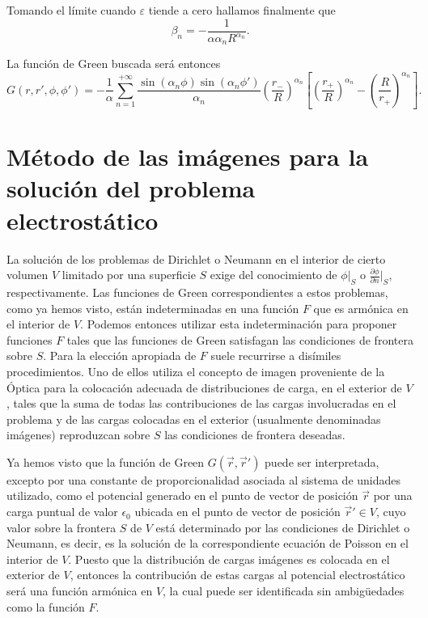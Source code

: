 \documentclass[12pt,a4paper]{book}
\begin{document}
Tomando el límite cuando $\varepsilon$ tiende a cero hallamos finalmente que
\begin{equation}
\beta_n = -\frac{1}{\alpha\alpha_n R^{\alpha_n}}.
\end{equation}

La función de Green buscada será entonces
\begin{equation}
G(r, r', \phi, \phi') = -\frac{1}{\alpha}\sum_{n=1}^{+\infty} \frac{\sin(\alpha_n \phi) \sin(\alpha_n \phi')}{\alpha_n} \left(\frac{r_-}{R}\right)^{\alpha_n} \left[\left(\frac{r_+}{R}\right)^{\alpha_n} - \left(\frac{R}{r_+}\right)^{\alpha_n}\right].
\end{equation}

\section{Método de las imágenes para la solución del problema electrostático}

La solución de los problemas de Dirichlet o Neumann en el interior de cierto volumen $V$ limitado por una superficie $S$ exige del conocimiento de $\phi|_S$ o $\frac{\partial\phi}{\partial n}\big|_S$, respectivamente. Las funciones de Green correspondientes a estos problemas, como ya hemos visto, están indeterminadas en una función $F$ que es armónica en el interior de $V$. Podemos entonces utilizar esta indeterminación para proponer funciones $F$ tales que las funciones de Green satisfagan las condiciones de frontera sobre $S$. Para la elección apropiada de $F$ suele recurrirse a disímiles procedimientos. Uno de ellos utiliza el concepto de imagen proveniente de la Óptica para la colocación adecuada de distribuciones de carga, en el exterior de $V$, tales que la suma de todas las contribuciones de las cargas involucradas en el problema y de las cargas colocadas en el exterior (usualmente denominadas imágenes) reproduzcan sobre $S$ las condiciones de frontera deseadas.

Ya hemos visto que la función de Green $G(\vec{r},\vec{r}')$ puede ser interpretada, excepto por una constante de proporcionalidad asociada al sistema de unidades utilizado, como el potencial generado en el punto de vector de posición $\vec{r}$ por una carga puntual de valor $\epsilon_0$ ubicada en el punto de vector de posición $\vec{r}' \in V$, cuyo valor sobre la frontera $S$ de $V$ está determinado por las condiciones de Dirichlet o Neumann, es decir, es la solución de la correspondiente ecuación de Poisson en el interior de $V$. Puesto que la distribución de cargas imágenes es colocada en el exterior de $V$, entonces la contribución de estas cargas al potencial electrostático será una función armónica en $V$, la cual puede ser identificada sin ambigüedades como la función $F$.
\end{document}
